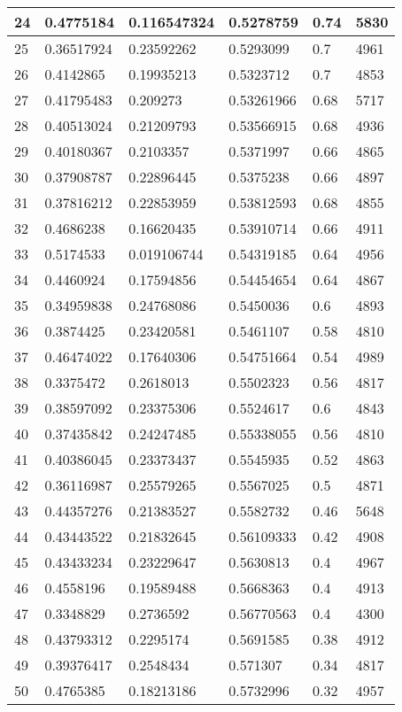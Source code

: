 \begin{longtable}{|l|l|l|l|l|l|}
24 & 0.4775184 & 0.116547324 & 0.5278759 & 0.74 & 5830 \\ \hline 
25 & 0.36517924 & 0.23592262 & 0.5293099 & 0.7 & 4961 \\ \hline 
26 & 0.4142865 & 0.19935213 & 0.5323712 & 0.7 & 4853 \\ \hline 
27 & 0.41795483 & 0.209273 & 0.53261966 & 0.68 & 5717 \\ \hline 
28 & 0.40513024 & 0.21209793 & 0.53566915 & 0.68 & 4936 \\ \hline 
29 & 0.40180367 & 0.2103357 & 0.5371997 & 0.66 & 4865 \\ \hline 
30 & 0.37908787 & 0.22896445 & 0.5375238 & 0.66 & 4897 \\ \hline 
31 & 0.37816212 & 0.22853959 & 0.53812593 & 0.68 & 4855 \\ \hline 
32 & 0.4686238 & 0.16620435 & 0.53910714 & 0.66 & 4911 \\ \hline 
33 & 0.5174533 & 0.019106744 & 0.54319185 & 0.64 & 4956 \\ \hline 
34 & 0.4460924 & 0.17594856 & 0.54454654 & 0.64 & 4867 \\ \hline 
35 & 0.34959838 & 0.24768086 & 0.5450036 & 0.6 & 4893 \\ \hline 
36 & 0.3874425 & 0.23420581 & 0.5461107 & 0.58 & 4810 \\ \hline 
37 & 0.46474022 & 0.17640306 & 0.54751664 & 0.54 & 4989 \\ \hline 
38 & 0.3375472 & 0.2618013 & 0.5502323 & 0.56 & 4817 \\ \hline 
39 & 0.38597092 & 0.23375306 & 0.5524617 & 0.6 & 4843 \\ \hline 
40 & 0.37435842 & 0.24247485 & 0.55338055 & 0.56 & 4810 \\ \hline 
41 & 0.40386045 & 0.23373437 & 0.5545935 & 0.52 & 4863 \\ \hline 
42 & 0.36116987 & 0.25579265 & 0.5567025 & 0.5 & 4871 \\ \hline 
43 & 0.44357276 & 0.21383527 & 0.5582732 & 0.46 & 5648 \\ \hline 
44 & 0.43443522 & 0.21832645 & 0.56109333 & 0.42 & 4908 \\ \hline 
45 & 0.43433234 & 0.23229647 & 0.5630813 & 0.4 & 4967 \\ \hline 
46 & 0.4558196 & 0.19589488 & 0.5668363 & 0.4 & 4913 \\ \hline 
47 & 0.3348829 & 0.2736592 & 0.56770563 & 0.4 & 4300 \\ \hline 
48 & 0.43793312 & 0.2295174 & 0.5691585 & 0.38 & 4912 \\ \hline 
49 & 0.39376417 & 0.2548434 & 0.571307 & 0.34 & 4817 \\ \hline 
50 & 0.4765385 & 0.18213186 & 0.5732996 & 0.32 & 4957 \\ \hline 
\end{longtable}